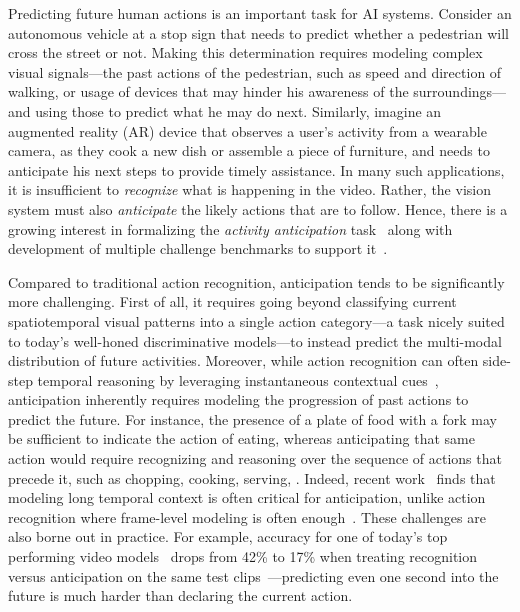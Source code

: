 \documentclass[10pt,twocolumn,letterpaper]{article}
\begin{document}
Predicting future human actions is an important task for AI systems. Consider an autonomous vehicle at a stop sign that needs to predict whether a pedestrian will cross the street or not. Making this determination  requires modeling complex visual signals---the past actions of the pedestrian, such as speed and direction of walking, or usage of devices that may hinder 
his awareness of the surroundings---and using those to predict what he may do next. Similarly, imagine an augmented reality (AR) device that observes a user's activity from a wearable camera, \eg as they cook a new dish or assemble a piece of furniture, and needs to anticipate his next steps to provide timely assistance. In many such applications,
it is insufficient to \emph{recognize} what is happening in the video.  Rather, the vision system must also \emph{anticipate} the likely actions that are to follow.
Hence, there is a growing interest in formalizing the \emph{activity anticipation} task~\cite{kitani2012activity,stein2013combining,kuehne2014language,rhinehart2017first,furnari2020rulstm,nagrajan2020egotopo} 
along with development of multiple challenge benchmarks to support it~\cite{stein2013combining,Damen2018EPICKITCHENS,li2018eye,damen2020rescaling,kuehne2014language}.

Compared to traditional action recognition, anticipation tends to be significantly more challenging.  First of all, 
it requires going beyond classifying current spatiotemporal visual patterns into a single action category---a task nicely suited to today's well-honed discriminative models---to instead predict the multi-modal distribution of future activities. Moreover, while action recognition can often side-step temporal reasoning by leveraging instantaneous contextual cues~\cite{girdhar2020cater}, anticipation inherently requires modeling the progression of past actions to predict the future. 
For instance, the presence of a plate of food with a fork may be sufficient to indicate the action of eating, whereas anticipating that same action would require recognizing and reasoning over the sequence of actions that precede it, such as chopping, cooking, serving, \etc.
Indeed, recent work~\cite{furnari2019rulstm,sener2020temporal} finds that modeling long temporal context is often critical for anticipation, unlike action recognition where frame-level modeling is often enough~\cite{ucf101,hmdb51,kay2017kinetics}. 
These challenges are also borne out in practice. For example, accuracy for one of today's  top performing video models~\cite{sener2020temporal} drops from 42\% to 17\% when treating recognition versus anticipation on the same test clips~\cite{Damen2018EPICKITCHENS}---predicting even one second into the future is much harder than declaring the current action.
\end{document}

